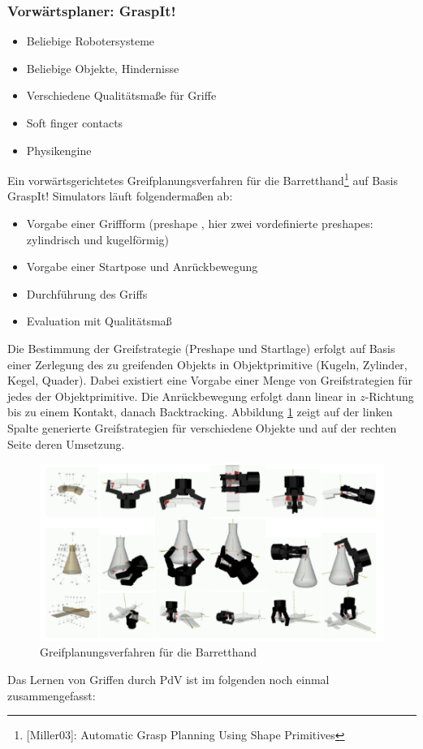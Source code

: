 \subsubsection*{Vorwärtsplaner: GraspIt!}
\begin{itemize}
\item Beliebige Robotersysteme
\item Beliebige Objekte, Hindernisse
\item Verschiedene Qualitätsmaße für Griffe
\item Soft finger contacts
\item Physikengine
\end{itemize}
Ein vorwärtsgerichtetes Greifplanungsverfahren für die Barretthand\footnote{[Miller03]: Automatic Grasp Planning Using Shape Primitives} auf Basis GraspIt! Simulators läuft folgendermaßen ab:
\begin{itemize}
\item Vorgabe einer Griffform (\Gu preshape \Go, hier zwei vordefinierte preshapes: zylindrisch und kugelförmig)
\item Vorgabe einer Startpose und Anrückbewegung
\item Durchführung des Griffs
\item Evaluation mit Qualitätsmaß
\end{itemize}
Die Bestimmung der Greifstrategie (Preshape und Startlage) erfolgt auf Basis einer Zerlegung des zu greifenden Objekts in Objektprimitive (Kugeln, Zylinder, Kegel, Quader). Dabei existiert eine Vorgabe einer Menge von Greifstrategien für jedes der Objektprimitive. Die Anrückbewegung erfolgt dann linear in $z$-Richtung bis zu einem Kontakt, danach Backtracking. Abbildung \ref{fig:ch04_griffe} zeigt auf der linken Spalte generierte Greifstrategien für verschiedene Objekte und auf der rechten Seite deren Umsetzung.
\begin{figure}[ht]\centering 
\includegraphics[width=0.3\linewidth]{figures/ch04_griffe.png}
\caption{Greifplanungsverfahren für die Barretthand}
\label{fig:ch04_griffe}
\end{figure}
\noindent
Das Lernen von Griffen durch PdV ist im folgenden noch einmal zusammengefasst:
